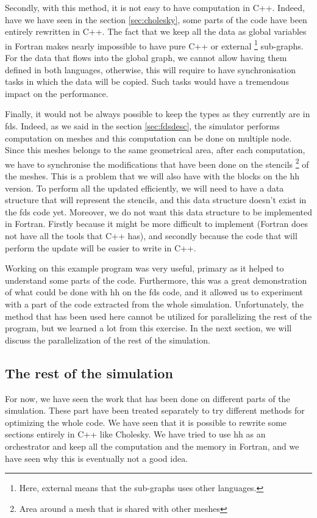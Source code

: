 Secondly, with this method, it is not easy to have computation in C++. Indeed,
have we have seen in the section \ref{sec:cholesky}, some parts of the code have
been entirely rewritten in C++. The fact that we keep all the data as global
variables in Fortran makes nearly impossible to have pure C++ or external
\footnote{Here, external means that the sub-graphs uses other languages.}
sub-graphs. For the data that flows into the global graph, we cannot allow
having them defined in both languages, otherwise, this will require to have
synchronisation tasks in which the data will be copied. Such tasks would have a
tremendous impact on the performance.

Finally, it would not be always possible to keep the types as they currently are
in \gls{fds}. Indeed, as we said in the section \ref{sec:fdsdesc}, the simulator
performs computation on meshes and this computation can be done on multiple
node. Since this meshes belongs to the same geometrical area, after each
computation, we have to synchronise the modifications that have been done on the
stencils \footnote{Area around a mesh that is shared with other meshes} of the
meshes. This is a problem that we will also have with the blocks on the \gls{hh}
version. To perform all the updated efficiently, we will need to have a data
structure that will represent the stencils, and this data structure doesn't
exist in the \gls{fds} code yet. Moreover, we do not want this data structure to
be implemented in Fortran. Firstly because it might be more difficult to
implement (Fortran does not have all the tools that C++ has), and secondly
because the code that will perform the update will be easier to write in C++.

Working on this example program was very useful, primary as it helped to
understand some parts of the code. Furthermore, this was a great demonstration
of what could be done with \gls{hh} on the \gls{fds} code, and it allowed us to
experiment with a part of the code extracted from the whole simulation.
Unfortunately, the method that has been used here cannot be utilized for
parallelizing the rest of the program, but we learned a lot from this exercise.
In the next section, we will discuss the parallelization of the rest of the
simulation.

\subsection{The rest of the simulation}

For now, we have seen the work that has been done on different parts of the
simulation. These part have been treated separately to try different methods for
optimizing the whole code. We have seen that it is possible to rewrite some
sections entirely in C++ like Cholesky. We have tried to use \gls{hh} as an
orchestrator and keep all the computation and the memory in Fortran, and we have
seen why this is eventually not a good idea.


